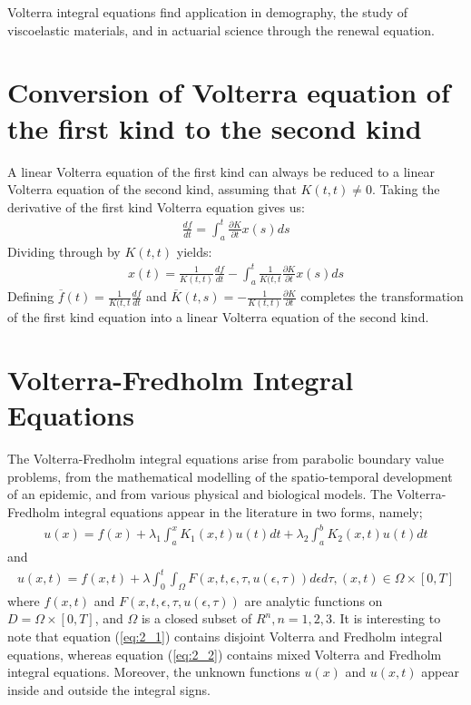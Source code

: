 \documentclass[11pt]{report}
\newcommand{\refn}[1]{(\ref{#1})}
\newcommand{\refx}[1]{\refn{eq:#1}}
\newcommand{\dsp}{\displaystyle}
\newcommand{\NI}{\noindent}
\begin{document}
	\NI Volterra integral equations find application in demography, the study of viscoelastic materials, and in actuarial science through the renewal equation.

	\section{Conversion of Volterra equation of the first kind to the second kind}
	A linear Volterra equation of the first kind can always be reduced to a linear Volterra equation of the second kind, assuming that $K(t,t)\neq{0}$. Taking the derivative of the first kind Volterra equation gives us:
	\begin{eqnarray*}
		\frac{df}{dt} = \int_{a}^{t} \frac{\partial K}{\partial t} x(s) ds
	\end{eqnarray*}
	Dividing through by $K(t,t)$ yields:
	\begin{eqnarray*}
		x(t) = \frac{1}{K(t,t)} \frac{df}{dt} - \int_{a}^{t} \frac{1}{K(t,t} \frac{\partial K}{\partial t} x(s) ds
	\end{eqnarray*}
	Defining $\dsp\overline{f}(t) = \frac{1}{K(t,t} \frac{df}{dt}$ and $\dsp\overline{K}(t,s) = -\frac{1}{K(t,t)} \frac{\partial K}{\partial t}$ completes the transformation of the first kind equation into a linear Volterra equation of the second kind.

	\section{Volterra-Fredholm Integral Equations}
	The Volterra-Fredholm integral equations arise from parabolic boundary value problems, from the mathematical modelling of the spatio-temporal development of an epidemic, and from various physical and biological models. The Volterra-Fredholm integral equations appear in the literature in two forms, namely;
	\begin{eqnarray}
		u(x) = f(x) + \lambda_{1} \int_{a}^{x} K_{1}(x,t) u(t) dt + \lambda_{2} \int_{a}^{b} K_{2}(x,t) u(t) dt\label{eq:2_1}
	\end{eqnarray}
	and
	\begin{eqnarray}
		u(x,t) = f(x,t) + \lambda \int_{0}^{t} \int_{\Omega}F(x,t,\epsilon ,\tau , u(\epsilon ,\tau)) d\epsilon d\tau, (x,t) \in \Omega \times [0,T]\label{eq:2_2}
	\end{eqnarray}
	where $f(x,t)$ and $F(x,t,\epsilon , \tau,u(\epsilon , \tau))$ are analytic functions on $D = \Omega \times [0,T]$, and $\Omega$ is a closed subset of $R^n, n =1 ,2,3$. It is interesting to note that equation \refx{2_1} contains disjoint Volterra and Fredholm integral equations, whereas equation \refx{2_2} contains mixed Volterra and Fredholm integral equations. Moreover, the unknown functions $u(x)$ and $u(x,t)$ appear inside and outside the integral signs.\\
	
\end{document}
